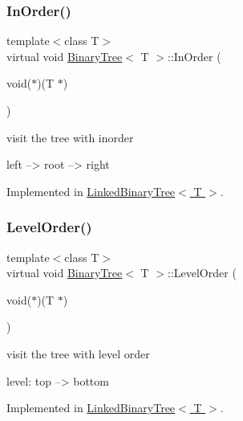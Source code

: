 \subsubsection{\texorpdfstring{In\+Order()}{InOrder()}}
{\footnotesize\ttfamily template$<$class T$>$ \\
virtual void \hyperlink{classBinaryTree}{Binary\+Tree}$<$ T $>$\+::In\+Order (\begin{DoxyParamCaption}\item[{void($\ast$)(T $\ast$)}]{ }\end{DoxyParamCaption})\hspace{0.3cm}{\ttfamily [pure virtual]}}

visit the tree with inorder \begin{DoxyVerb}left --> root --> right
\end{DoxyVerb}
 

Implemented in \hyperlink{classLinkedBinaryTree_a82b1a5995e90671905da7502d7f58eba}{Linked\+Binary\+Tree$<$ T $>$}.

\mbox{\label{classBinaryTree_a1d6ccf7f6b6e1b9a702b12fd5ca6dc32}} 
\subsubsection{\texorpdfstring{Level\+Order()}{LevelOrder()}}
{\footnotesize\ttfamily template$<$class T$>$ \\
virtual void \hyperlink{classBinaryTree}{Binary\+Tree}$<$ T $>$\+::Level\+Order (\begin{DoxyParamCaption}\item[{void($\ast$)(T $\ast$)}]{ }\end{DoxyParamCaption})\hspace{0.3cm}{\ttfamily [pure virtual]}}

visit the tree with level order \begin{DoxyVerb}level: top --> bottom
\end{DoxyVerb}
 

Implemented in \hyperlink{classLinkedBinaryTree_a5ca48cd9b784ca7cdf0f41d03dbc4873}{Linked\+Binary\+Tree$<$ T $>$}.

\mbox{\label{classBinaryTree_a8bc36fb3d3a12ef13d30cc9b4b84e428}} 
